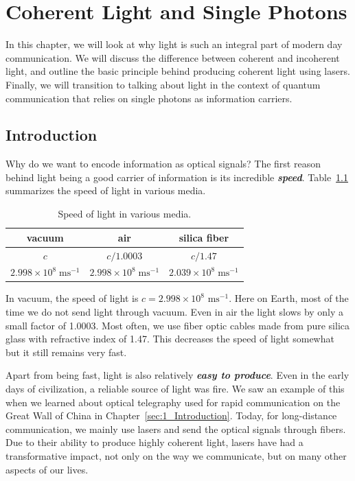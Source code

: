 \chapter{Coherent Light and Single Photons}
\label{sec:5_coherent_light_single_photons}

In this chapter, we will look at why light is such an integral part of modern day communication.
We will discuss the difference between coherent and incoherent light, and outline the basic principle behind producing coherent light using lasers.
Finally, we will transition to talking about light in the context of quantum communication that relies on single photons as information carriers.

\section{Introduction}
\label{sec:5-1_intoduction}

Why do we want to encode information as optical signals?
The first reason behind light being a good carrier of information is its incredible \textit{\textbf{speed}}.
Table~\ref{tab:5-1_speed_light} summarizes the speed of light in various media.
\begin{table}[b!]
    \setcellgapes{5pt}
    \renewcommand\theadfont{}
    \makegapedcells
    \centering
    \begin{tabular}{ccc}
        \hline
        \textbf{vacuum} & \textbf{air} & \textbf{silica fiber} \\
        \hline
        $c$ & $c/1.0003$ & $c/1.47$ \\
        $2.998\times10^{8} \; \text{ms}^{-1}$ & $2.998\times10^{8} \; \text{ms}^{-1}$ & $2.039\times10^{8} \; \text{ms}^{-1}$ \\
        \hline
    \end{tabular}
    \caption[Speed of light]{Speed of light in various media.}
    \label{tab:5-1_speed_light}
\end{table}
In vacuum, the speed of light is $c=2.998\times 10^8$ $\text{ms}^{-1}$.
Here on Earth, most of the time we do not send light through vacuum.
Even in air the light slows by only a small factor of 1.0003.
Most often, we use fiber optic cables made from pure silica glass with refractive index of 1.47.
This decreases the speed of light somewhat but it still remains very fast.

Apart from being fast, light is also relatively \textit{\textbf{easy to produce}}.
Even in the early days of civilization, a reliable source of light was fire.
We saw an example of this when we learned about optical telegraphy used for rapid communication on the Great Wall of China in Chapter~\ref{sec:1_Introduction}.
Today, for long-distance communication, we mainly use lasers and send the optical signals through fibers.
Due to their ability to produce highly coherent light, lasers have had a transformative impact, not only on the way we communicate, but on many other aspects of our lives. 

